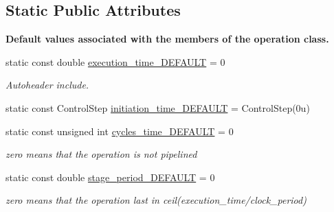 \subsection*{Static Public Attributes}
\begin{Indent}\textbf{ Default values associated with the members of the operation class.}\par
\begin{DoxyCompactItemize}
\item 
static const double \hyperlink{classtime__model_a36ea9e8031fda2f9282c8062a647d5c6}{execution\+\_\+time\+\_\+\+D\+E\+F\+A\+U\+LT} = 0
\begin{DoxyCompactList}\small\item\em Autoheader include. \end{DoxyCompactList}\item 
static const Control\+Step \hyperlink{classtime__model_a2980a7b7ec9e81d952719dde6336ded6}{initiation\+\_\+time\+\_\+\+D\+E\+F\+A\+U\+LT} = Control\+Step(0u)
\item 
static const unsigned int \hyperlink{classtime__model_ae61b7de7c0f11fb728ecd5b2f4766121}{cycles\+\_\+time\+\_\+\+D\+E\+F\+A\+U\+LT} = 0
\begin{DoxyCompactList}\small\item\em zero means that the operation is not pipelined \end{DoxyCompactList}\item 
static const double \hyperlink{classtime__model_a5ec0e13fa38fb22ff03d6cffd8fbd0fd}{stage\+\_\+period\+\_\+\+D\+E\+F\+A\+U\+LT} = 0
\begin{DoxyCompactList}\small\item\em zero means that the operation last in ceil(execution\+\_\+time/clock\+\_\+period) \end{DoxyCompactList}\end{DoxyCompactItemize}
\end{Indent}
